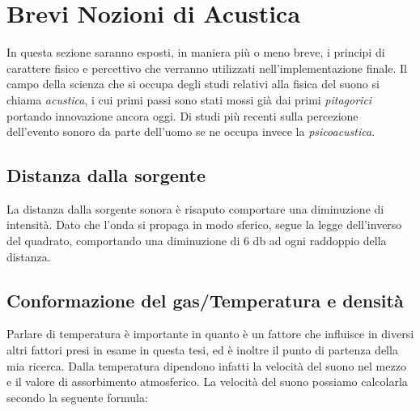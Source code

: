 %

\section{Brevi Nozioni di Acustica}

In questa sezione saranno esposti, in maniera più o meno breve, i principi di carattere fisico e 
percettivo che verranno utilizzati nell'implementazione finale.
Il campo della scienza che si occupa degli studi relativi alla fisica del suono si 
chiama \emph{acustica}, i cui primi passi sono stati mossi già dai primi \textit{pitagorici} 
portando innovazione ancora oggi. Di studi più recenti sulla percezione dell'evento sonoro 
da parte dell'uomo se ne occupa invece la \textit{psicoacustica}.

\subsection{Distanza dalla sorgente}

La distanza dalla sorgente sonora è risaputo comportare una diminuzione di
intensità. Dato che l’onda si propaga in modo sferico, segue la legge
dell’inverso del quadrato, comportando una diminuzione di 6 db ad ogni raddoppio
della distanza.

\subsection{Conformazione del gas/Temperatura e densità}

Parlare di temperatura è importante in quanto è un fattore che influisce in
diversi altri fattori presi in esame in questa tesi, ed è inoltre il punto di
partenza della mia ricerca.
Dalla temperatura dipendono infatti la velocità del suono nel mezzo e il valore
di assorbimento atmosferico.
La velocità del suono possiamo calcolarla secondo la seguente formula:


